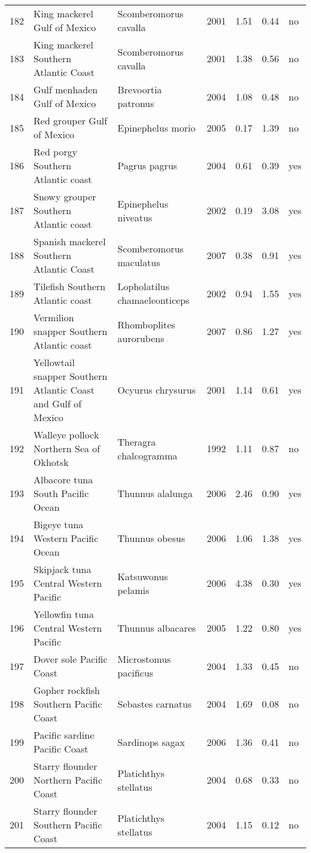 \begin{table}[ht]
\begin{center}
\begin{tabular}{rllrrrl}
  182 & King mackerel Gulf of Mexico & Scomberomorus cavalla & 2001 & 1.51 & 0.44 & no \\
  183 & King mackerel Southern Atlantic Coast & Scomberomorus cavalla & 2001 & 1.38 & 0.56 & no \\
  184 & Gulf menhaden Gulf of Mexico & Brevoortia patronus & 2004 & 1.08 & 0.48 & no \\
  185 & Red grouper Gulf of Mexico & Epinephelus morio & 2005 & 0.17 & 1.39 & no \\
  186 & Red porgy Southern Atlantic coast & Pagrus pagrus & 2004 & 0.61 & 0.39 & yes \\
  187 & Snowy grouper Southern Atlantic coast & Epinephelus niveatus & 2002 & 0.19 & 3.08 & yes \\
  188 & Spanish mackerel Southern Atlantic Coast & Scomberomorus maculatus & 2007 & 0.38 & 0.91 & yes \\
  189 & Tilefish Southern Atlantic coast & Lopholatilus chamaeleonticeps & 2002 & 0.94 & 1.55 & yes \\
  190 & Vermilion snapper Southern Atlantic coast & Rhomboplites aurorubens & 2007 & 0.86 & 1.27 & yes \\
  191 & Yellowtail snapper Southern Atlantic Coast and Gulf of Mexico & Ocyurus chrysurus & 2001 & 1.14 & 0.61 & yes \\
  192 & Walleye pollock Northern Sea of Okhotsk & Theragra chalcogramma & 1992 & 1.11 & 0.87 & no \\
  193 & Albacore tuna South Pacific Ocean & Thunnus alalunga & 2006 & 2.46 & 0.90 & yes \\
  194 & Bigeye tuna Western Pacific Ocean & Thunnus obesus & 2006 & 1.06 & 1.38 & yes \\
  195 & Skipjack tuna Central Western Pacific & Katsuwonus pelamis & 2006 & 4.38 & 0.30 & yes \\
  196 & Yellowfin tuna Central Western Pacific & Thunnus albacares & 2005 & 1.22 & 0.80 & yes \\
  197 & Dover sole Pacific Coast & Microstomus pacificus & 2004 & 1.33 & 0.45 & no \\
  198 & Gopher rockfish Southern Pacific Coast & Sebastes carnatus & 2004 & 1.69 & 0.08 & no \\
  199 & Pacific sardine Pacific Coast & Sardinops sagax & 2006 & 1.36 & 0.41 & no \\
  200 & Starry flounder Northern Pacific Coast & Platichthys stellatus & 2004 & 0.68 & 0.33 & no \\
  201 & Starry flounder Southern Pacific Coast & Platichthys stellatus & 2004 & 1.15 & 0.12 & no \\

\end{tabular}
\end{center}
\end{table}
